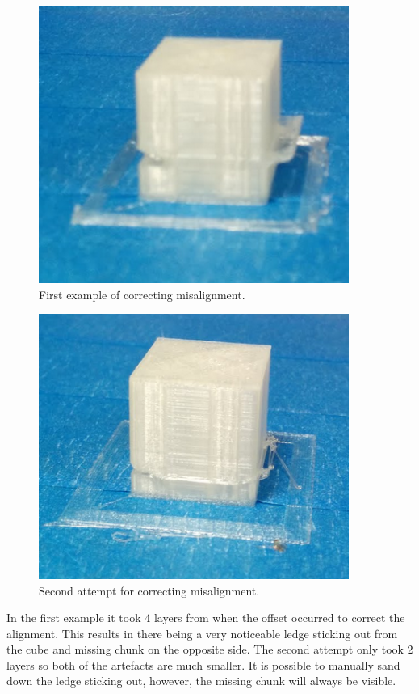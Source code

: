\documentclass[11pt]{report} %
\begin{document}
\begin{figure}[H]
  \centering
  \includegraphics[width=4in]{Misalign2.png}
  \caption{First example of correcting misalignment.}
  \label{figure:Misalign2}
\end{figure}

\begin{figure}[H]
  \centering
  \includegraphics[width=4in]{Misalign3.png}
  \caption{Second attempt for correcting misalignment.}
  \label{figure:Misalign3}
\end{figure}

In the first example it took 4 layers from when the offset occurred to correct the alignment. This results in there being a very noticeable ledge sticking out from the cube and missing chunk on the opposite side. The second attempt only took 2 layers so both of the artefacts are much smaller. It is possible to manually sand down the ledge sticking out, however, the missing chunk will always be visible. 
\end{document}
